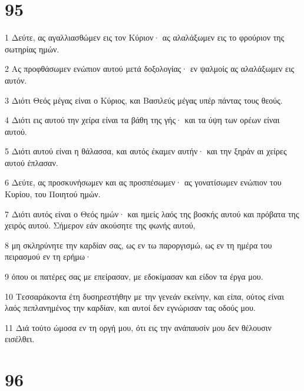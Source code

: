 \chapter{95}

\par 1 Δεύτε, ας αγαλλιασθώμεν εις τον Κύριον· ας αλαλάξωμεν εις το φρούριον της σωτηρίας ημών.
\par 2 Ας προφθάσωμεν ενώπιον αυτού μετά δοξολογίας· εν ψαλμοίς ας αλαλάξωμεν εις αυτόν.
\par 3 Διότι Θεός μέγας είναι ο Κύριος, και Βασιλεύς μέγας υπέρ πάντας τους θεούς.
\par 4 Διότι εις αυτού την χείρα είναι τα βάθη της γής· και τα ύψη των ορέων είναι αυτού.
\par 5 Διότι αυτού είναι η θάλασσα, και αυτός έκαμεν αυτήν· και την ξηράν αι χείρες αυτού έπλασαν.
\par 6 Δεύτε, ας προσκυνήσωμεν και ας προσπέσωμεν· ας γονατίσωμεν ενώπιον του Κυρίου, του Ποιητού ημών.
\par 7 Διότι αυτός είναι ο Θεός ημών· και ημείς λαός της βοσκής αυτού και πρόβατα της χειρός αυτού. Σήμερον εάν ακούσητε της φωνής αυτού,
\par 8 μη σκληρύνητε την καρδίαν σας, ως εν τω παροργισμώ, ως εν τη ημέρα του πειρασμού εν τη ερήμω·
\par 9 όπου οι πατέρες σας με επείρασαν, με εδοκίμασαν και είδον τα έργα μου.
\par 10 Τεσσαράκοντα έτη δυσηρεστήθην με την γενεάν εκείνην, και είπα, ούτος είναι λαός πεπλανημένος την καρδίαν, και αυτοί δεν εγνώρισαν τας οδούς μου.
\par 11 Διά τούτο ώμοσα εν τη οργή μου, ότι εις την ανάπαυσίν μου δεν θέλουσιν εισέλθει.

\chapter{96}

